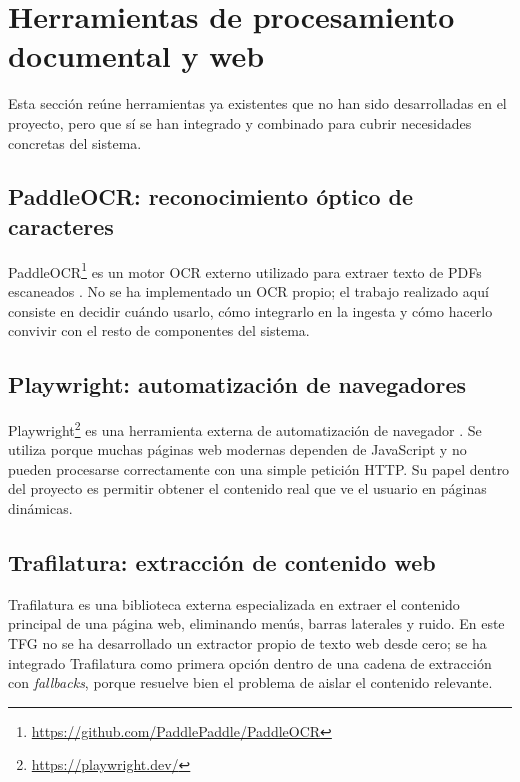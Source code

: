 \section{Herramientas de procesamiento documental y web}
\label{sec:herramientas-procesamiento}

Esta sección reúne herramientas ya existentes que no han sido desarrolladas en el proyecto, pero que sí se han integrado y combinado para cubrir necesidades concretas del sistema.

\subsection{PaddleOCR: reconocimiento óptico de caracteres}

PaddleOCR\footnote{\url{https://github.com/PaddlePaddle/PaddleOCR}} es un motor OCR externo utilizado para extraer texto de PDFs escaneados \cite{paddleocr2024docs}. No se ha implementado un OCR propio; el trabajo realizado aquí consiste en decidir cuándo usarlo, cómo integrarlo en la ingesta y cómo hacerlo convivir con el resto de componentes del sistema.

\subsection{Playwright: automatización de navegadores}

Playwright\footnote{\url{https://playwright.dev/}} es una herramienta externa de automatización de navegador \cite{playwright2024docs}. Se utiliza porque muchas páginas web modernas dependen de JavaScript y no pueden procesarse correctamente con una simple petición HTTP. Su papel dentro del proyecto es permitir obtener el contenido real que ve el usuario en páginas dinámicas.

\subsection{Trafilatura: extracción de contenido web}

Trafilatura es una biblioteca externa especializada en extraer el contenido principal de una página web, eliminando menús, barras laterales y ruido. En este TFG no se ha desarrollado un extractor propio de texto web desde cero; se ha integrado Trafilatura como primera opción dentro de una cadena de extracción con \textit{fallbacks}, porque resuelve bien el problema de aislar el contenido relevante.

